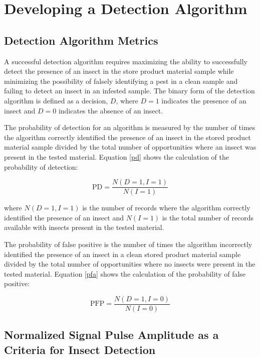 \documentclass[../Vibro-Acoustic Signatures and Detection Algorithms for Stored Product Insects.tex]{subfiles}
\begin{document}
\chapter{Developing a Detection Algorithm}

\section{Detection Algorithm Metrics}

A successful detection algorithm requires maximizing the ability to successfully detect the presence of an insect in the store product material sample while minimizing the possibility of falsely identifying a pest in a clean sample and failing to detect an insect in an infested sample. The binary form of the detection algorithm is defined as a decision, $D$, where $D=1$ indicates the presence of an insect and $D=0$ indicates the absence of an insect. 

The probability of detection for an algorithm is measured by the number of times the algorithm correctly identified the presence of an insect in the stored product material sample divided by the total number of opportunities where an insect was present in the tested material. Equation \ref{pd} shows the calculation of the probability of detection:

\begin{equation}
	\label{pd}
	\text{PD} = \frac{N(D=1, I=1)}{N(I=1)}
\end{equation}

where $N(D=1, I=1)$ is the number of records where the algorithm correctly identified the presence of an insect and $N(I=1)$ is the total number of records available with insects present in the tested material. 

The probability of false positive is the number of times the algorithm incorrectly identified the presence of an insect in a clean stored product material sample divided by the total number of opportunities where no insects were present in the tested material. Equation \ref{pfa} shows the calculation of the probability of false positive:

\begin{equation}
	\label{pfa}
	\text{PFP} = \frac{N(D=1, I=0)}{N(I=0)}
\end{equation}

\section{Normalized Signal Pulse Amplitude as a Criteria for Insect Detection}
\end{document}
